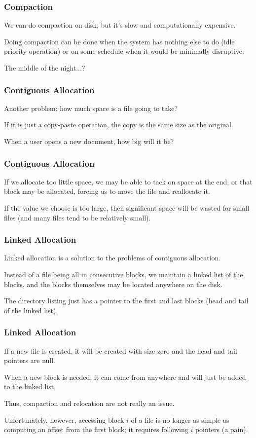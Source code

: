 \begin{frame}
\frametitle{Compaction}

We can do compaction on disk, but it's slow and computationally expensive. 

Doing compaction can be done when the system has nothing else to do (idle priority operation) or on some schedule when it would be minimally disruptive.

The middle of the night...?


\end{frame}

\begin{frame}
\frametitle{Contiguous Allocation}

Another problem: how much space is a file going to take? 

If it is just a copy-paste operation, the copy is the same size as the original. 

When a user opens a new document, how big will it be? 

\end{frame}

\begin{frame}
\frametitle{Contiguous Allocation}


If we allocate too little space, we may be able to tack on space at the end, or that block may be allocated, forcing us to move the file and reallocate it. 

If the value we choose is too large, then significant space will be wasted for small files (and many files tend to be relatively small).

\end{frame}

\begin{frame}
\frametitle{Linked Allocation}

Linked allocation is a solution to the problems of contiguous allocation.

Instead of a file being all in consecutive blocks, we maintain a linked list of the blocks, and the blocks themselves may be located anywhere on the disk. 

The directory listing just has a pointer to the first and last blocks (head and tail of the linked list).

\end{frame}

\begin{frame}
\frametitle{Linked Allocation}

If a new file is created, it will be created with size zero and the head and tail pointers are null.

 When a new block is needed, it can come from anywhere and will just be added to the linked list. 
 
 Thus, compaction and relocation are not really an issue. 
 
 Unfortunately, however, accessing block $i$ of a file is no longer as simple as computing an offset from the first block; it requires following $i$ pointers (a pain).


\end{frame}

